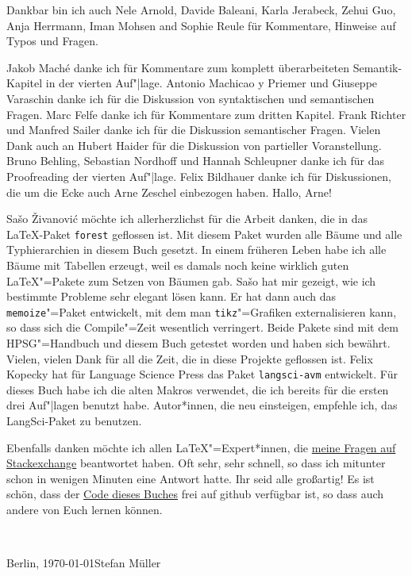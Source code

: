 Dankbar bin ich auch Nele Arnold, Davide Baleani, Karla Jerabeck, Zehui Guo, Anja Herrmann, Iman
Mohsen and Sophie Reule für Kommentare, Hinweise auf Typos und Fragen. 

Jakob Maché danke ich für Kommentare zum komplett überarbeiteten Semantik-Kapitel in der vierten Auf"|lage.
Antonio Machicao y Priemer und Giuseppe Varaschin danke ich für die Diskussion von syntaktischen und
semantischen Fragen. Marc Felfe danke ich für Kommentare zum dritten Kapitel. Frank Richter und Manfred Sailer
danke ich für die Diskussion semantischer Fragen. Vielen Dank auch an Hubert Haider für die
Diskussion von partieller Voranstellung. Bruno Behling, Sebastian Nordhoff und Hannah Schleupner
danke ich für das Proofreading der vierten Auf"|lage. Felix Bildhauer danke ich für Diskussionen, die um die Ecke auch Arne Zeschel einbezogen
haben. Hallo, Arne!

Sašo Živanović möchte ich allerherzlichst für die Arbeit danken, die in das \LaTeX-Paket \texttt{forest} geflossen
ist. Mit diesem Paket wurden alle Bäume und alle Typhierarchien in diesem Buch gesetzt. In einem
früheren Leben habe ich alle Bäume mit Tabellen erzeugt, weil es damals noch keine wirklich guten
\LaTeX"=Pakete zum Setzen von Bäumen gab. Sašo hat mir gezeigt, wie ich bestimmte Probleme sehr
elegant lösen kann. Er hat dann auch das \texttt{memoize}"=Paket entwickelt, mit dem man \texttt{tikz}"=Grafiken
externalisieren kann, so dass sich die Compile"=Zeit wesentlich verringert. Beide Pakete sind mit dem
HPSG"=Handbuch und diesem Buch getestet worden und haben sich bewährt. Vielen, vielen Dank für all die Zeit,
die in diese Projekte geflossen ist. Felix Kopecky hat für Language Science Press das Paket
\texttt{langsci-avm} entwickelt. Für dieses Buch habe ich die alten Makros verwendet, die ich
bereits für die ersten drei Auf"|lagen benutzt habe. Autor*innen, die neu einsteigen, empfehle ich,
das LangSci-Paket zu benutzen.

Ebenfalls danken möchte ich allen \LaTeX"=Expert*innen, die \href{https://tex.stackexchange.com/users/18561/stefan-m%c3%bcller?tab=questions}{meine Fragen auf Stackexchange}
beantwortet haben. Oft sehr, sehr schnell, so dass ich mitunter schon in wenigen Minuten eine
Antwort hatte. Ihr seid alle großartig! Es ist schön, dass der
\href{https://github.com/langsci/535}{Code dieses Buches} frei auf github verfügbar ist, so dass auch andere von Euch lernen können.


~\medskip

\noindent
Berlin, \today\hfill Stefan Müller
